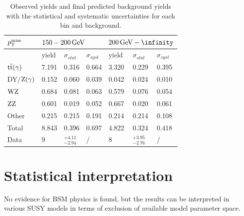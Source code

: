 \begin{table}[tbp]
 \centering
 \caption{Observed yields and final predicted background yields with the statistical and systematic uncertainties for each bin and background.}
 \normalsize
 \label{tab:results}
 \begin{tabular}{lllllll}
  $p_{\mathrm{T}}^\text{miss}$      & \multicolumn{3}{l}{$150-200\,\text{Ge\hspace{-.08em}V}$} & \multicolumn{3}{l}{$200\GeV-\infinity$}                                                                  \\\hline
                 & yield                             & $\sigma_{stat}$                         & $\sigma_{syst}$ & yield & $\sigma_{stat}$    & $\sigma_{syst}$ \\\hline
  ${\mathrm{t}\overline{\mathrm{t}}}(\gamma)$ & 7.191                             & 0.316                                   & 0.664           & 3.320 & 0.229              & 0.395           \\
  DY/$\mathrm{Z}(\gamma)$ & 0.152                             & 0.060                                   & 0.039           & 0.042 & 0.024              & 0.010           \\
  $\mathrm{W}\mathrm{Z}$       & 0.684                             & 0.081                                   & 0.063           & 0.579 & 0.076              & 0.054           \\
  $\mathrm{Z}\mathrm{Z}$       & 0.601                             & 0.019                                   & 0.052           & 0.667 & 0.020              & 0.061           \\
  Other          & 0.215                             & 0.215                                   & 0.191           & 0.214 & 0.214              & 0.108           \\\hline
  Total          & 8.843                             & 0.396                                   & 0.697           & 4.822 & 0.324              & 0.418           \\\hline
  Data           & 9                                 & $^{+4.11}_{-2.94}$                      & /               & 8     & $^{+3.95}_{-2.76}$ & /               \\\hline
 \end{tabular}
\end{table}


\section{Statistical interpretation}
No evidence for BSM physics is found, but the results can be interpreted in various SUSY models in terms of exclusion of available model parameter space.
